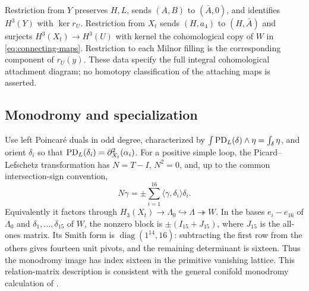 Restriction from $Y$ preserves $H,L$, sends $(A,B)$ to $(\bar A,0)$,
and identifies $H^3(Y)$ with $\ker r_U$. Restriction from $X_t$ sends
$(H,a_4)$ to $(H,\bar A)$ and surjects $H^3(X_t)\to H^3(U)$ with
kernel the cohomological copy of $W$ in \eqref{eq:connecting-maps}.
Restriction to each Milnor filling is the corresponding component of
$r_U(y)$. These data specify the full integral cohomological attachment
diagram; no homotopy classification of the attaching maps is asserted.

\subsection{Monodromy and specialization}\label{sec:specialization}
Use left Poincar\'e duals in odd degree, characterized by
$\int\operatorname{PD}_L(\delta)\wedge\eta=\int_\delta\eta$, and orient $\delta_i$
so that $\operatorname{PD}_L(\delta_i)=\partial_{X_t}^2(\alpha_i)$.
For a positive simple loop, the Picard--Lefschetz transformation has
$N=T-I$, $N^2=0$, and, up to the common intersection-sign convention,
\begin{equation}\label{eq:monodromy}
 N\gamma=\pm\sum_{i=1}^{16}\langle\gamma,\delta_i\rangle\delta_i.
\end{equation}
Equivalently it factors through
$H_3(X_t)\to \Lambda_0\hookrightarrow\Lambda\twoheadrightarrow W$.
In the bases $e_i-e_{16}$ of $\Lambda_0$ and $\delta_1,\ldots,\delta_{15}$
of $W$, the nonzero block is $\pm(I_{15}+J_{15})$, where $J_{15}$
is the all-ones matrix. Its Smith form is
$\operatorname{diag}(1^{14},16)$: subtracting the first row from the
others gives fourteen unit pivots, and the remaining determinant is
sixteen. Thus the monodromy image has index sixteen in the primitive
vanishing lattice. This relation-matrix description is consistent with
the general conifold monodromy calculation of \cite{lee-lin-wang}.

